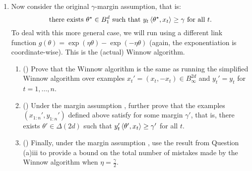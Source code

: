\documentclass{article}
\begin{document}
\begin{enumerate}[leftmargin=*,align=left]
\begin{enumerate}[leftmargin=*,align=left]
\begin{enumerate}[leftmargin=*,align=left]
\end{enumerate}


\vspace{5pt}
\item
Now consider the original $\gamma$-margin assumption, that is: 
\begin{equation}\label{eqn:margin}
\text{there exists $\theta^\star \in B_1^d$ such that $y_t\left\langle \theta^\star,x_t \right\rangle \geq \gamma$ for all $t$.}
\end{equation}
To deal with this more general case, we will run  using a different link function $g(\theta) = \exp(\eta\theta)-\exp(-\eta\theta)$ (again, the exponentiation is coordinate-wise).
This is the (actual) Winnow algorithm.
\\

\begin{enumerate}[leftmargin=*,align=left]
\vspace{5pt}
\item () 
Prove that the Winnow algorithm is the same as running the simplified Winnow algorithm over examples $x_t' = (x_t, -x_t) \in B_\infty^{2d}$ and $y_t' = y_t$ for $t = 1, \ldots, n$. \\


\vspace{5pt}
\item () 
Under the margin assumption , further prove that the examples $(x_{1:n}', y_{1:n}')$ defined above satisfy  for some margin $\gamma'$, that is, there exists $\theta' \in \Delta(2d)$ such that $y_t'\left\langle \theta',x_t \right\rangle \geq \gamma'$ for all $t$. \\


\vspace{5pt}
\item () 
Finally, under the margin assumption  , use the result from Question (a)iii to provide a bound on the total number of mistakes made by the Winnow algorithm when $\eta = \frac{\gamma}{2}$. \\


\end{enumerate}

\end{enumerate}


\end{enumerate}
\end{document}
